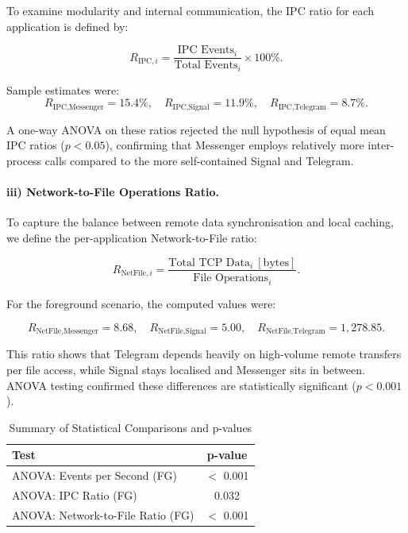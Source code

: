 \documentclass[a4paper,12pt]{report}
\begin{document}
To examine modularity and internal communication, the IPC ratio for each application is defined by:

\[
R_{\text{IPC},i} = \frac{\text{IPC Events}_i}{\text{Total Events}_i} \times 100\%.
\]

Sample estimates were:
\[
R_{\text{IPC,Messenger}} = 15.4\%, \quad
R_{\text{IPC,Signal}} = 11.9\%, \quad
R_{\text{IPC,Telegram}} = 8.7\%.
\]

A one-way ANOVA on these ratios rejected the null hypothesis of equal mean IPC ratios ($p < 0.05$), confirming that Messenger employs relatively more inter-process calls compared to the more self-contained Signal and Telegram.

\paragraph{iii) Network-to-File Operations Ratio.}

To capture the balance between remote data synchronisation and local caching, we define the per-application Network-to-File ratio:

\[
R_{\text{NetFile},i} = \frac{\text{Total TCP Data}_i~[\text{bytes}]}{\text{File Operations}_i}.
\]

For the foreground scenario, the computed values were:

\[
R_{\text{NetFile,Messenger}} = 8.68, \quad
R_{\text{NetFile,Signal}} = 5.00, \quad
R_{\text{NetFile,Telegram}} = 1,278.85.
\]

This ratio shows that Telegram depends heavily on high-volume remote transfers per file access, while Signal stays localised and Messenger sits in between. ANOVA testing confirmed these differences are statistically significant ($p < 0.001$).

\begin{table}[H]
    \centering
    \caption{Summary of Statistical Comparisons and p-values}
    \label{tab:comparative_tests}
    \begin{tabular}{|l|c|}
        \hline
        \textbf{Test} & \textbf{p-value} \\
        \hline
        ANOVA: Events per Second (FG) & $<$ 0.001 \\
        ANOVA: IPC Ratio (FG) & 0.032 \\
        ANOVA: Network-to-File Ratio (FG) & $<$ 0.001 \\
        \hline
    \end{tabular}
\end{table}
\end{document}
